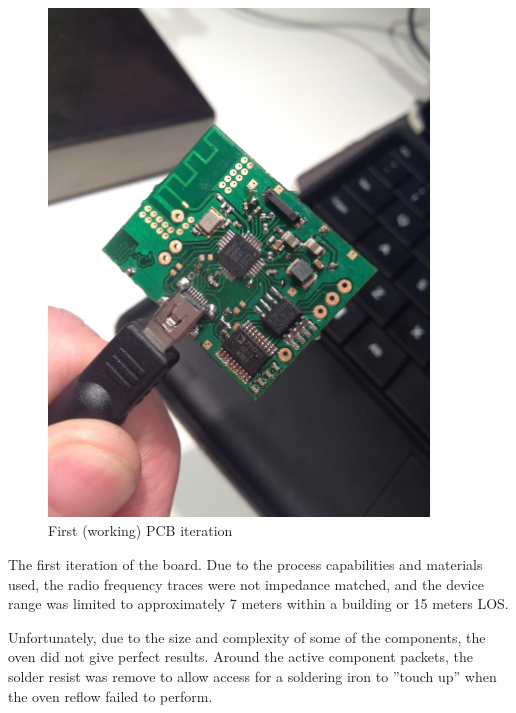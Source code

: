 \documentclass[]{article}
\begin{document}
\begin{figure}[h]
	\begin{center}
		\includegraphics[width = 0.9\textwidth]{pcb1.jpg}
	\end{center}
	\caption{First (working) PCB iteration}
	\label{fig:pcb1.jpg}
\end{figure}

The first iteration of the board. Due to the process capabilities and materials used, the radio frequency traces were not impedance matched, and the device range was limited to approximately 7 meters within a building or 15 meters \ac{LOS}. 


Unfortunately, due to the size and complexity of some of the components, the oven did not give perfect results. Around the active component packets, the solder resist was remove to allow access for a soldering iron to ''touch up'' when the oven reflow failed to perform. 
\end{document}

